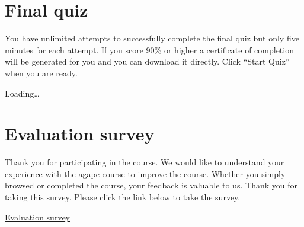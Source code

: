 \documentclass[
]{book}
\begin{document}
\hypertarget{final-quiz}{%
\chapter*{Final quiz}\label{final-quiz}}

You have unlimited attempts to successfully complete the final quiz but only five minutes for each attempt. If you score 90\% or higher a certificate of completion will be generated for you and you can download it directly. Click ``Start Quiz'' when you are ready.

Loading\ldots{}

\hypertarget{evaluation-survey}{%
\chapter*{Evaluation survey}\label{evaluation-survey}}

Thank you for participating in the course. We would like to understand your experience with the agape course to improve the course. Whether you simply browsed or completed the course, your feedback is valuable to us. Thank you for taking this survey. Please click the link below to take the survey.

\href{https://forms.gle/qLPF231TzeGYCwhE6}{Evaluation survey}

  
\end{document}
